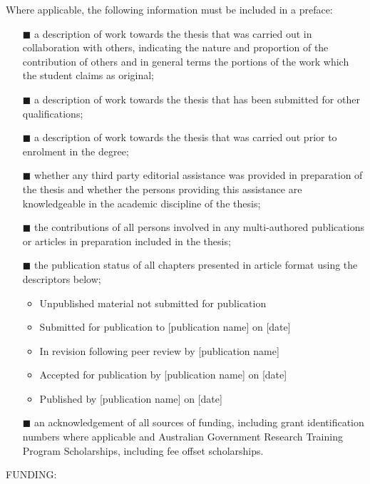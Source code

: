 {Where applicable, the following information must be included in a preface:
\begin{itemize}
\item[\tiny{$\blacksquare$}] a description of work towards the thesis that was carried out in collaboration with others, indicating the nature and proportion of the contribution of others and in general terms the portions of the work which the student claims as original;
\item[\tiny{$\blacksquare$}] a description of work towards the thesis that has been submitted for other qualifications;
\item[\tiny{$\blacksquare$}] a description of work towards the thesis that was carried out prior to enrolment in the degree;
\item[\tiny{$\blacksquare$}] whether any third party editorial assistance was provided in preparation of
the thesis and whether the persons providing this assistance are knowledgeable in the academic discipline of the thesis;
\item[\tiny{$\blacksquare$}] the contributions of all persons involved in any multi-authored publications or
articles in preparation included in the thesis;
\item[\tiny{$\blacksquare$}] the publication status of all chapters presented in article format using the
descriptors below;
    \begin{itemize}
        \item Unpublished material not submitted for publication
        \item Submitted for publication to [publication name] on [date]
        \item In revision following peer review by [publication name]
        \item Accepted for publication by [publication name] on [date]
        \item Published by [publication name] on [date]
    \end{itemize}
\item[\tiny{$\blacksquare$}] an acknowledgement of all sources of funding, including grant identification
numbers where applicable and Australian Government Research Training Program Scholarships, including fee offset scholarships.
\end{itemize}

FUNDING:

}
